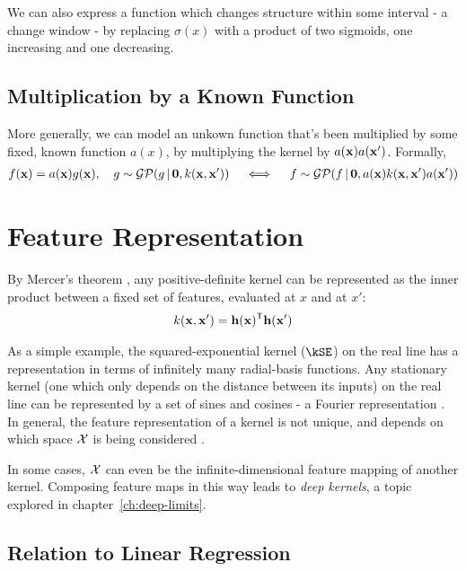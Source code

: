 We can also express a function which changes structure within some interval - a change window - by replacing $\sigma(x)$ with a product of two sigmoids, one increasing and one decreasing.

\subsection{Multiplication by a Known Function}

More generally, we can model an unkown function that's been multiplied by some fixed, known function $a(x)$, by multiplying the kernel by $a({\bf{x}}) a({\bf{x}}')$.
Formally,
%
\begin{align}
f({\bf{x}}) = a({\bf{x}}) g({\bf{x}}), \quad g \sim \mathcal{GP}\!\left(g \, \middle| \, {\bf{0}}, k({\bf{x}}, {\bf{x}}') \right) \quad
\iff
\quad f \sim \mathcal{GP}\!\left(f \, \middle| \, {\bf{0}},  a({\bf{x}}) k({\bf{x}}, {\bf{x}}') a({\bf{x}}') \right)
\end{align}




\section{Feature Representation}
%
By Mercer's theorem \citep{mercer1909functions},
any positive-definite kernel can be represented as the inner product between a fixed set of features, evaluated at $x$ and at $x'$:
%
\begin{align}
k({\bf{x}}, {\bf{x}}') = {\bf{h}}({\bf{x}})^{\mathsf{T}} {\bf{h}}({\bf{x}}')
\end{align}

As a simple example, the squared-exponential kernel ($\kSE$) on the real line has a representation in terms of infinitely many radial-basis functions.
Any stationary kernel (one which only depends on the distance between its inputs) on the real line can be represented by a set of sines and cosines - a Fourier representation \citep{bochner1959lectures}.
In general, the feature representation of a kernel is not unique, and depends on which space $\mathcal{X}$ is being considered \citep{minh2006mercer}.

In some cases, $\mathcal{X}$ can even be the infinite-dimensional feature mapping of another kernel.  Composing feature maps in this way leads to \emph{deep kernels}, a topic explored in chapter~\ref{ch:deep-limits}.



\subsection{Relation to Linear Regression}

